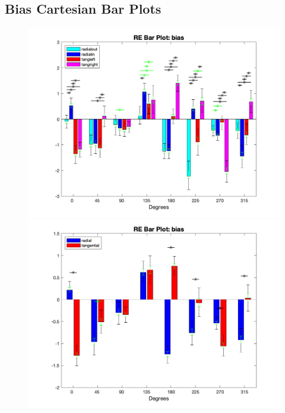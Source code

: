 \documentclass[11pt]{article} %
\begin{document}
\subsection{Bias Cartesian Bar Plots}
\begin{figure}[H]
\centering %
\includegraphics[scale=.35]{Images/RE_BP_bias_Alldata_4conds.png}
\includegraphics[scale=.35]{Images/RE_BP_bias_Alldata_2conds.png}
\end{figure}
\end{document}
